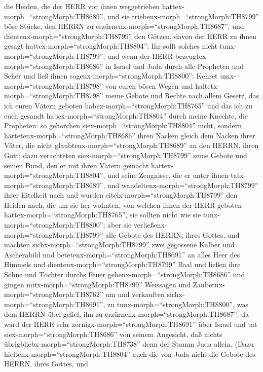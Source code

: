 die Heiden, die der HERR vor ihnen weggetrieben
hattex-morph=``strongMorph:TH8689'', und sie
triebenx-morph=``strongMorph:TH8799'' böse Stücke, den HERRN zu
erzürnenx-morph=``strongMorph:TH8687'',  und
dientenx-morph=``strongMorph:TH8799'' den Götzen, davon der HERR zu
ihnen gesagt hattex-morph=``strongMorph:TH8804'': Ihr sollt solches
nicht tunx-morph=``strongMorph:TH8799'';  und wenn der HERR
bezeugtex-morph=``strongMorph:TH8686'' in Israel und Juda durch alle
Propheten und Seher und ließ ihnen sagenx-morph=``strongMorph:TH8800'':
Kehret umx-morph=``strongMorph:TH8798'' von euren bösen Wegen und
haltetx-morph=``strongMorph:TH8798'' meine Gebote und Rechte nach allem
Gesetz, das ich euren Vätern geboten habex-morph=``strongMorph:TH8765''
und das ich zu euch gesandt habex-morph=``strongMorph:TH8804'' durch
meine Knechte, die Propheten:  so gehorchen
siex-morph=``strongMorph:TH8804'' nicht, sondern
härtetenx-morph=``strongMorph:TH8686'' ihren Nacken gleich dem Nacken
ihrer Väter, die nicht glaubtenx-morph=``strongMorph:TH8689'' an den
HERRN, ihren Gott;  dazu verachteten
siex-morph=``strongMorph:TH8799'' seine Gebote und seinen Bund, den er
mit ihren Vätern gemacht hattex-morph=``strongMorph:TH8804'', und seine
Zeugnisse, die er unter ihnen tatx-morph=``strongMorph:TH8689'', und
wandeltenx-morph=``strongMorph:TH8799'' ihrer Eitelkeit nach und wurden
eitelx-morph=``strongMorph:TH8799'' den Heiden nach, die um sie her
wohnten, von welchen ihnen der HERR geboten
hattex-morph=``strongMorph:TH8765'', sie sollten nicht wie sie
tunx-morph=``strongMorph:TH8800'';  aber sie
verließenx-morph=``strongMorph:TH8799'' alle Gebote des HERRN, ihres
Gottes, und machten sichx-morph=``strongMorph:TH8799'' zwei gegossene
Kälber und Ascherabild und betetenx-morph=``strongMorph:TH8691'' an
alles Heer des Himmels und dientenx-morph=``strongMorph:TH8799'' Baal
 und ließen ihre Söhne und Töchter durchs Feuer
gehenx-morph=``strongMorph:TH8686'' und gingen
mitx-morph=``strongMorph:TH8799'' Weissagen und
Zaubernx-morph=``strongMorph:TH8762'' um und verkauften
sichx-morph=``strongMorph:TH8691'', zu
tunx-morph=``strongMorph:TH8800'', was dem HERRN übel gefiel, ihn zu
erzürnenx-morph=``strongMorph:TH8687'':  da ward der HERR
sehr zornigx-morph=``strongMorph:TH8691'' über Israel und tat
siex-morph=``strongMorph:TH8686'' von seinem Angesicht, daß nichts
übrigbliebx-morph=``strongMorph:TH8738'' denn der Stamm Juda allein.
 (Dazu hieltenx-morph=``strongMorph:TH8804'' auch die von
Juda nicht die Gebote des HERRN, ihres Gottes, und
